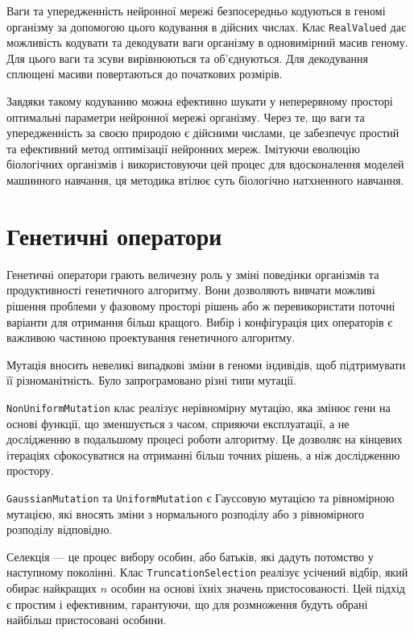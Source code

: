 Ваги та упередженність нейронної мережі безпосередньо кодуються в 
геномі організму за допомогою цього кодування в дійсних числах. 
Клас \verb+RealValued+ дає можливість кодувати та декодувати 
ваги організму в одновимірний масив геному. 
Для цього ваги та зсуви вирівнюються та об'єднуються. 
Для декодування сплющені масиви повертаються до початкових розмірів.

Завдяки такому кодуванню можна ефективно шукати у неперервному 
просторі оптимальні параметри нейронної мережі організму. 
Через те, що ваги та упередженність за своєю природою 
є дійсними числами, це забезпечує простий та ефективний 
метод оптимізації нейронних мереж. 
Імітуючи еволюцію біологічних організмів і використовуючи 
цей процес для вдосконалення моделей машинного навчання, 
ця методика втілює суть біологічно натхненного навчання.


\section{Генетичні оператори}

Генетичні оператори грають величезну роль у зміні 
поведінки організмів та продуктивності генетичного алгоритму. 
Вони дозволяють вивчати можливі рішення проблеми у 
фазовому просторі рішень або ж перевикористати поточні 
варіанти для отримання більш кращого. 
Вибір і конфігурація цих операторів є важливою частиною 
проектування генетичного алгоритму.

Мутація вносить невеликі випадкові зміни в геноми індивідів, 
щоб підтримувати її різноманітність. 
Було запрограмовано різні типи мутації.

\verb+NonUniformMutation+ клас реалізує нерівномірну мутацію, 
яка змінює гени на основі функції, що зменшується з часом, 
сприяючи експлуатації, а не дослідженню в подальшому процесі роботи алгоритму. 
Це дозволяє на кінцевих ітераціях сфокосуватися на отриманні більш 
точних рішень, а ніж дослідженню простору.

\verb+GaussianMutation+ та \verb+UniformMutation+ є Гауссовую мутацією 
та рівномірною мутацією, які вносять зміни з нормального розподілу 
або з рівномірного розподілу відповідно.

Селекція --- це процес вибору особин, або батьків, 
які дадуть потомство у наступному поколінні. 
Клас \verb+TruncationSelection+ реалізує усічений відбір, 
який обирає найкращих $n$ особин на основі їхніх значень пристосованості. 
Цей підхід є простим і ефективним, гарантуючи, 
що для розмноження будуть обрані найбільш пристосовані особини.

